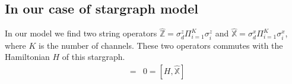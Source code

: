 \documentclass[reprint,prb,superscriptaddress]{revtex4-2}
\begin{document}
%
%
%
%

\subsection{In our case of stargraph model}
\noindent In our model we find two string operators $\hat{\mathbb{Z}}=\sigma_d^z\Pi_{i=1}^{K} \sigma_i^z$ and $\hat{\mathbb{X}}=\sigma_d^x\Pi_{i=1}^{K} \sigma_i^x$, where $K$ is the number of channels. These two operators commutes with the Hamiltonian $H$ of this stargraph.
\begin{eqnarray}
[H,\hat{\mathbb{Z}}] &=& 0 = [H,\hat{\mathbb{X}}]
\end{eqnarray}
\end{document}
